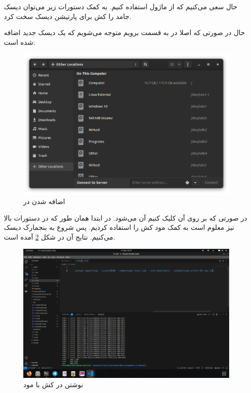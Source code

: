حال سعی می‌کنیم که از ماژول
استفاده کنیم. به کمک دستورات زیر می‌توان دیسک جامد را کش برای پارتیشن دیسک سخت کرد.

حال در صورتی که اصلا در
به قسمت
برویم متوجه می‌شویم که یک دیسک جدید اضافه شده است:
\begin{figure}[H]
    \centering
    \includegraphics[scale=0.5]{pic/3-cas-nautilus.png}
    \caption{اضافه شدن  در }
    \label{fig:cas_in_file_explorer}
\end{figure}
در صورتی که بر روی آن کلیک کنیم آن
می‌شود. در ابتدا همان طور که در دستورات بالا نیز معلوم است به کمک مود
کش را استفاده کردیم. پس شروع به بنجمارک دیسک می‌کنیم. نتایج آن در شکل
\ref{fig:3-4-wt}
آمده است.
\begin{figure}[H]
    \centering
    \includegraphics[scale=0.25]{pic/3-wt.png}
    \caption{نوشتن در کش با مود }
    \label{fig:3-4-wt}
\end{figure}
